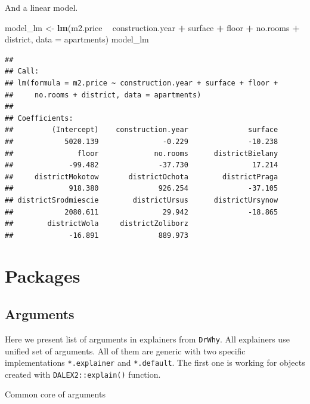 \documentclass[]{krantz}
\newenvironment{Shaded}{\begin{snugshade}}{\end{snugshade}}
\newcommand{\DataTypeTok}[1]{\textcolor[rgb]{0.13,0.29,0.53}{#1}}
\newcommand{\KeywordTok}[1]{\textcolor[rgb]{0.13,0.29,0.53}{\textbf{#1}}}
\newcommand{\NormalTok}[1]{#1}
\newcommand{\OperatorTok}[1]{\textcolor[rgb]{0.81,0.36,0.00}{\textbf{#1}}}
\newcommand{\StringTok}[1]{\textcolor[rgb]{0.31,0.60,0.02}{#1}}
\theoremstyle{definition}
\theoremstyle{definition}
\theoremstyle{definition}
\theoremstyle{remark}
\begin{document}
And a linear model.

\begin{Shaded}
\begin{Highlighting}[]
\NormalTok{model_lm <-}\StringTok{ }\KeywordTok{lm}\NormalTok{(m2.price }\OperatorTok{~}\StringTok{ }\NormalTok{construction.year }\OperatorTok{+}\StringTok{ }\NormalTok{surface }\OperatorTok{+}\StringTok{ }\NormalTok{floor }\OperatorTok{+}\StringTok{ }\NormalTok{no.rooms }\OperatorTok{+}\StringTok{ }\NormalTok{district, }\DataTypeTok{data =}\NormalTok{ apartments)}
\NormalTok{model_lm}
\end{Highlighting}
\end{Shaded}

\begin{verbatim}
## 
## Call:
## lm(formula = m2.price ~ construction.year + surface + floor + 
##     no.rooms + district, data = apartments)
## 
## Coefficients:
##         (Intercept)    construction.year              surface  
##            5020.139               -0.229              -10.238  
##               floor             no.rooms      districtBielany  
##             -99.482              -37.730               17.214  
##     districtMokotow       districtOchota        districtPraga  
##             918.380              926.254              -37.105  
## districtSrodmiescie        districtUrsus      districtUrsynow  
##            2080.611               29.942              -18.865  
##        districtWola     districtZoliborz  
##             -16.891              889.973
\end{verbatim}

\hypertarget{Packages}{%
\section{Packages}\label{Packages}}

\hypertarget{arguments}{%
\subsection{Arguments}\label{arguments}}

Here we present list of arguments in explainers from \texttt{DrWhy}. All
explainers use unified set of arguments. All of them are generic with
two specific implementations \texttt{*.explainer} and
\texttt{*.default}. The first one is working for objects created with
\texttt{DALEX2::explain()} function.

Common core of arguments
\end{document}
